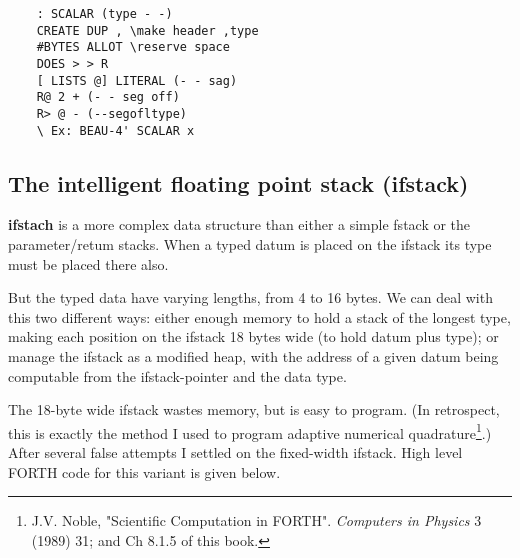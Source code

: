 \begin{lstlisting}
    : SCALAR (type - -)
    CREATE DUP , \make header ,type
    #BYTES ALLOT \reserve space
    DOES > > R
    [ LISTS @] LITERAL (- - sag)
    R@ 2 + (- - seg off)
    R> @ - (--segofltype)
    \ Ex: BEAU-4' SCALAR x
\end{lstlisting}

\subsection{The intelligent floating point stack (ifstack)}
 \textbf{ifstach} is a more complex data structure than either a simple fstack or the parameter/retum stacks. When a typed datum is placed on the ifstack its type must be placed there also.

But the typed data have varying lengths, from 4 to 16 bytes. We can deal with this two different ways: either  enough memory to hold a stack of the longest type, making each position on the ifstack 18 bytes wide (to hold datum plus type); or manage the ifstack as a modified heap, with the address of a given datum being computable from the ifstack-pointer and the data type.

The 18-byte wide ifstack wastes memory, but is easy to program. (In retrospect, this is exactly the method I used to program adaptive numerical quadrature\footnote{J.V. Noble, "Scientific Computation in FORTH". \textit{Computers in Physics} 3 (1989) 31; and Ch 8.1.5 of this book.}.) After several false attempts I settled on the fixed-width ifstack. High level FORTH code for this variant is given below.

